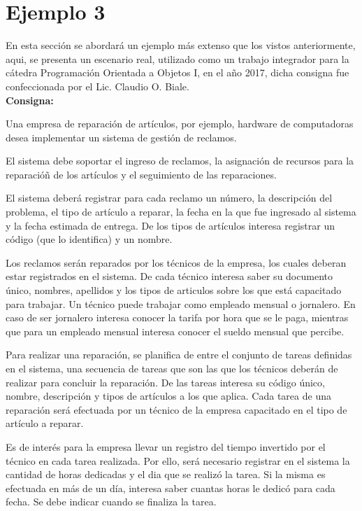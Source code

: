 

\section{Ejemplo 3}
\label{sec:ej3}
En esta sección se abordará un ejemplo más extenso que los vistos anteriormente,
aqui, se presenta un escenario real, utilizado como un trabajo integrador para
la cátedra Programación Orientada a Objetos I, en el año 2017, dicha consigna
fue confeccionada por el Lic. Claudio O. Biale.\\

\textbf{Consigna:}
\begin{displayquote}
Una empresa de reparación de artículos, por ejemplo, hardware de computadoras
desea implementar un sistema de gestión de reclamos.

El sistema debe soportar el ingreso de reclamos, la asignación de recursos para
la reparacióñ de los artículos y el seguimiento de las reparaciones.

El sistema deberá registrar para cada reclamo un número, la descripción del
problema, el tipo de artículo a reparar, la fecha en la que fue ingresado al
sistema y la fecha estimada de entrega. De los tipos de artículos interesa
registrar un código (que lo identifica) y un nombre.

Los reclamos serán reparados por los técnicos de la empresa, los cuales deberan
estar registrados en el sistema. De cada técnico interesa saber su documento
único, nombres, apellidos y los tipos de articulos sobre los que está
capacitado para trabajar. Un técnico puede trabajar como empleado mensual o
jornalero. En caso de ser jornalero interesa conocer la tarifa por hora que se
le paga, mientras que para un empleado mensual interesa conocer el sueldo
mensual que percibe.

Para realizar una reparación, se planifica de entre el conjunto de tareas
definidas en el sistema, una secuencia de tareas que son las que los técnicos
deberán de realizar para concluir la reparación. De las tareas interesa su
código único, nombre, descripción y tipos de artículos a los que aplica. Cada
tarea de una reparación será efectuada por un técnico de la empresa capacitado
en el tipo de artículo a reparar.

Es de interés para la empresa llevar un registro del tiempo invertido por el
técnico en cada tarea realizada. Por ello, será necesario registrar en el
sistema la cantidad de horas dedicadas y el dia que se realizó la tarea. Si la
misma es efectuada en más de un día, interesa saber cuantas horas le dedicó
para cada fecha. Se debe indicar cuando se finaliza la tarea.
\end{displayquote}

